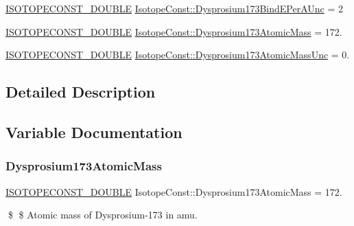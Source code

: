 \begin{DoxyCompactItemize}
\mbox{\hyperlink{group___isotope_const-_macros_ga8f45a7272ce02c0b4c65c44636ed719a}{I\+S\+O\+T\+O\+P\+E\+C\+O\+N\+S\+T\+\_\+\+D\+O\+U\+B\+LE}} \mbox{\hyperlink{group___isotope_const-_dysprosium-_dy173_gac77c9020d9edfc6e1d10df663fca0f0e}{Isotope\+Const\+::\+Dysprosium173\+Bind\+E\+Per\+A\+Unc}} = 2
\item 
\mbox{\hyperlink{group___isotope_const-_macros_ga8f45a7272ce02c0b4c65c44636ed719a}{I\+S\+O\+T\+O\+P\+E\+C\+O\+N\+S\+T\+\_\+\+D\+O\+U\+B\+LE}} \mbox{\hyperlink{group___isotope_const-_dysprosium-_dy173_gae2db02211b915123c70f52f1611792d1}{Isotope\+Const\+::\+Dysprosium173\+Atomic\+Mass}} = 172.
\item 
\mbox{\hyperlink{group___isotope_const-_macros_ga8f45a7272ce02c0b4c65c44636ed719a}{I\+S\+O\+T\+O\+P\+E\+C\+O\+N\+S\+T\+\_\+\+D\+O\+U\+B\+LE}} \mbox{\hyperlink{group___isotope_const-_dysprosium-_dy173_gaa212d045ea914fe78726968a0c366520}{Isotope\+Const\+::\+Dysprosium173\+Atomic\+Mass\+Unc}} = 0.
\end{DoxyCompactItemize}


\subsection{Detailed Description}


\subsection{Variable Documentation}
\mbox{\label{group___isotope_const-_dysprosium-_dy173_gae2db02211b915123c70f52f1611792d1}} 
\subsubsection{\texorpdfstring{Dysprosium173\+Atomic\+Mass}{Dysprosium173AtomicMass}}
{\footnotesize\ttfamily \mbox{\hyperlink{group___isotope_const-_macros_ga8f45a7272ce02c0b4c65c44636ed719a}{I\+S\+O\+T\+O\+P\+E\+C\+O\+N\+S\+T\+\_\+\+D\+O\+U\+B\+LE}} Isotope\+Const\+::\+Dysprosium173\+Atomic\+Mass = 172.}

\$ \$ Atomic mass of Dysprosium-\/173 in amu. \mbox{\label{group___isotope_const-_dysprosium-_dy173_gaa212d045ea914fe78726968a0c366520}} 
